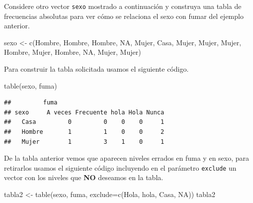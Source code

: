 \documentclass[
]{book}
\makeatletter
\newenvironment{Shaded}{\begin{snugshade}}{\end{snugshade}}
\newcommand{\AttributeTok}[1]{\textcolor[rgb]{0.77,0.63,0.00}{#1}}
\newcommand{\ConstantTok}[1]{\textcolor[rgb]{0.00,0.00,0.00}{#1}}
\newcommand{\FunctionTok}[1]{\textcolor[rgb]{0.00,0.00,0.00}{#1}}
\newcommand{\NormalTok}[1]{#1}
\newcommand{\OtherTok}[1]{\textcolor[rgb]{0.56,0.35,0.01}{#1}}
\newcommand{\StringTok}[1]{\textcolor[rgb]{0.31,0.60,0.02}{#1}}
\newenvironment{kframe}{%
\medskip{}
\setlength{\fboxsep}{.8em}
 \def\at@end@of@kframe{}%
 \ifinner\ifhmode%
  \def\at@end@of@kframe{\end{minipage}}%
  \begin{minipage}{\columnwidth}%
 \fi\fi%
 \def\FrameCommand##1{\hskip\@totalleftmargin \hskip-\fboxsep
 \colorbox{shadecolor}{##1}\hskip-\fboxsep
     \hskip-\linewidth \hskip-\@totalleftmargin \hskip\columnwidth}%
 \MakeFramed {\advance\hsize-\width
   \@totalleftmargin\z@ \linewidth\hsize
   \@setminipage}}%
 {\par\unskip\endMakeFramed%
 \at@end@of@kframe}
\renewenvironment{Shaded}{\begin{kframe}}{\end{kframe}}
\makeatother
\begin{document}
Considere otro vector \texttt{sexo} mostrado a continuación y construya una tabla de frecuencias absolutas para ver cómo se relaciona el sexo con fumar del ejemplo anterior.

\begin{Shaded}
\begin{Highlighting}[]
\NormalTok{sexo }\OtherTok{\textless{}{-}} \FunctionTok{c}\NormalTok{(}\StringTok{\textquotesingle{}Hombre\textquotesingle{}}\NormalTok{, }\StringTok{\textquotesingle{}Hombre\textquotesingle{}}\NormalTok{, }\StringTok{\textquotesingle{}Hombre\textquotesingle{}}\NormalTok{, }\ConstantTok{NA}\NormalTok{, }\StringTok{\textquotesingle{}Mujer\textquotesingle{}}\NormalTok{,}
          \StringTok{\textquotesingle{}Casa\textquotesingle{}}\NormalTok{, }\StringTok{\textquotesingle{}Mujer\textquotesingle{}}\NormalTok{, }\StringTok{\textquotesingle{}Mujer\textquotesingle{}}\NormalTok{, }\StringTok{\textquotesingle{}Mujer\textquotesingle{}}\NormalTok{, }\StringTok{\textquotesingle{}Hombre\textquotesingle{}}\NormalTok{, }\StringTok{\textquotesingle{}Mujer\textquotesingle{}}\NormalTok{, }
          \StringTok{\textquotesingle{}Hombre\textquotesingle{}}\NormalTok{, }\ConstantTok{NA}\NormalTok{, }\StringTok{\textquotesingle{}Mujer\textquotesingle{}}\NormalTok{, }\StringTok{\textquotesingle{}Mujer\textquotesingle{}}\NormalTok{)}
\end{Highlighting}
\end{Shaded}

Para construir la tabla solicitada usamos el siguiente código.

\begin{Shaded}
\begin{Highlighting}[]
\FunctionTok{table}\NormalTok{(sexo, fuma)}
\end{Highlighting}
\end{Shaded}

\begin{verbatim}
##         fuma
## sexo     A veces Frecuente hola Hola Nunca
##   Casa         0         0    0    0     1
##   Hombre       1         1    0    0     2
##   Mujer        1         3    1    0     1
\end{verbatim}

De la tabla anterior vemos que aparecen niveles errados en fuma y en sexo, para retirarlos usamos el siguiente código incluyendo en el parámetro \texttt{exclude} un vector con los niveles que \textbf{NO} deseamos en la tabla.

\begin{Shaded}
\begin{Highlighting}[]
\NormalTok{tabla2 }\OtherTok{\textless{}{-}} \FunctionTok{table}\NormalTok{(sexo, fuma, }\AttributeTok{exclude=}\FunctionTok{c}\NormalTok{(}\StringTok{\textquotesingle{}Hola\textquotesingle{}}\NormalTok{, }\StringTok{\textquotesingle{}hola\textquotesingle{}}\NormalTok{, }\StringTok{\textquotesingle{}Casa\textquotesingle{}}\NormalTok{, }\ConstantTok{NA}\NormalTok{))}
\NormalTok{tabla2}
\end{Highlighting}
\end{Shaded}
\end{document}
